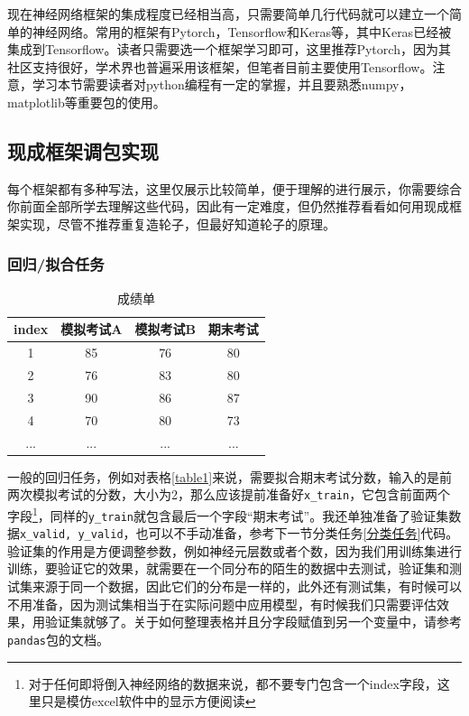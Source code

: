 \documentclass[a5paper, 11pt, openany]{book}
\begin{document}
现在神经网络框架的集成程度已经相当高，只需要简单几行代码就可以建立一个简单的神经网络。常用的框架有Pytorch，Tensorflow和Keras等，其中Keras已经被集成到Tensorflow。读者只需要选一个框架学习即可，这里推荐Pytorch，因为其社区支持很好，学术界也普遍采用该框架，但笔者目前主要使用Tensorflow。注意，学习本节需要读者对python编程有一定的掌握，并且要熟悉numpy，matplotlib等重要包的使用。

\subsection{现成框架调包实现}

每个框架都有多种写法，这里仅展示比较简单，便于理解的进行展示，你需要综合你前面全部所学去理解这些代码，因此有一定难度，但仍然推荐看看如何用现成框架实现，尽管不推荐重复造轮子，但最好知道轮子的原理。

\subsubsection{回归/拟合任务}

\begin{table}[ht]
    \centering
    \begin{tabular}{c c c c}
      index & 模拟考试A & 模拟考试B & 期末考试  \\ \hline
         1  & 85     &   76     &  80      \\ 
         2  & 76     &   83     &  80      \\ 
         3  & 90     &   86     &  87      \\
         4  & 70     &   80     &  73      \\
         ...&  ...   &   ...    &  ...
    \end{tabular}
    \caption{成绩单}
\end{table}

一般的回归任务，例如对表格\ref{table1}来说，需要拟合期末考试分数，输入的是前两次模拟考试的分数，大小为2，那么应该提前准备好\verb|x_train|，它包含前面两个字段\footnote{对于任何即将倒入神经网络的数据来说，都不要专门包含一个index字段，这里只是模仿excel软件中的显示方便阅读}，同样的\verb|y_train|就包含最后一个字段“期末考试”。我还单独准备了验证集数据\verb|x_valid, y_valid|，也可以不手动准备，参考下一节分类任务\ref{分类任务}代码。验证集的作用是方便调整参数，例如神经元层数或者个数，因为我们用训练集进行训练，要验证它的效果，就需要在一个同分布的陌生的数据中去测试，验证集和测试集来源于同一个数据，因此它们的分布是一样的，此外还有测试集，有时候可以不用准备，因为测试集相当于在实际问题中应用模型，有时候我们只需要评估效果，用验证集就够了。关于如何整理表格并且分字段赋值到另一个变量中，请参考\verb|pandas|包的文档。
\end{document}
